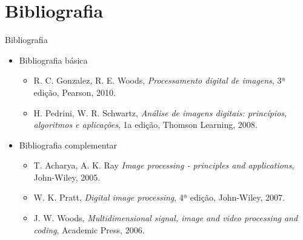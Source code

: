    \section[ slide = true]{Bibliografia}
   \begin{slide}[toc=]{Bibliografia}
      \begin{itemize}
       \item Bibliografia básica
       \begin{itemize}
          \item R. C. Gonzalez, R. E. Woods, \emph{Processamento digital de imagens}, 3ª edição, Pearson, 2010.
          \item H. Pedrini, W. R. Schwartz, \emph{Análise de imagens digitais: princípios, algoritmos e aplicações}, 1a edição, Thomson Learning, 2008.
       \end{itemize}
       \item Bibliografia complementar
       \begin{itemize}
          \item T. Acharya, A. K. Ray \emph{Image processing - principles and applications}, John-Wiley,  2005.
          \item W. K. Pratt, \emph{Digital image processing}, 4ª edição, John-Wiley,  2007.
          \item J. W. Woods, \emph{Multidimensional signal, image and video processing and coding}, Academic Press,  2006.
       \end{itemize}
      \end{itemize}
   \end{slide}
  
